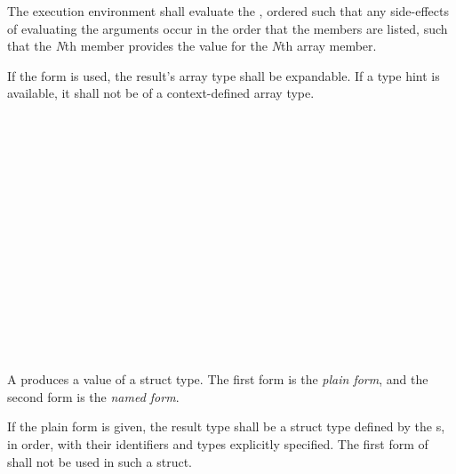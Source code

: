 \specsubsubitem
The execution environment shall evaluate the ,
ordered such that any side-effects of evaluating the arguments occur in the
order that the members are listed, such that the \textit{N}th member provides
the value for the \textit{N}th array member.

\specsubsubitem
If the  form is used, the result's array type shall be expandable.
If a type hint is available, it shall not be of a context-defined array type.


\begin{grammar}
 \\
	 \terminal{\{}  \optional{\terminal{,}} \terminal{\}} \\
	 \terminal{\{}  \optional{\terminal{,}} \terminal{\}} \\

 \\
	 \\
	 \terminal{,}  \\
	 \\

 \\
	 \\
	 \terminal{,}  \\

 \\
	 \terminal{=}  \\
	 \terminal{:}  \terminal{=}  \\
	 \\
\end{grammar}

\specsubsubitem
A  produces a value of a struct type. The first
form is the \textit{plain form}, and the second form is the \textit{named form}.

\specsubsubitem
If the plain form is given, the result type shall be a struct type defined by
the s, in order, with their identifiers and types
explicitly specified. The first form of  shall not be
used in such a struct.

